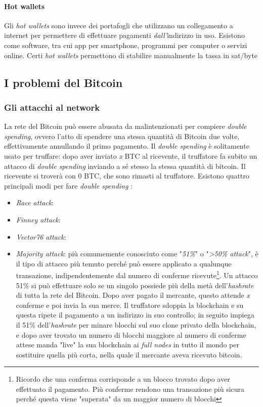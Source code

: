 \documentclass {article}
\begin{document}
\paragraph {Hot wallets}

Gli \textit{hot wallets} sono invece dei portafogli che utilizzano un collegamento a internet per permettere di effettuare pagamenti \emph{dall'}indirizzo in uso.
Esistono come software, tra cui app per smartphone, programmi per computer o servizi online.
Certi \textit{hot wallets} permettono di stabilire manualmente la tassa in sat/byte


\subsection {I problemi del Bitcoin}


\subsubsection {Gli attacchi al network}


La rete del Bitcoin può essere abusata da malintenzionati per compiere \textit{double spending}, ovvero l'atto di spendere una stessa quantità di Bitcoin due volte, effettivamente annullando il primo pagamento.
Il \textit{double spending} è solitamente usato per truffare: dopo aver inviato \textit{x} BTC al ricevente, il truffatore fa subito un attacco di \textit{double spending} inviando a sé stesso la stessa quantità di bitcoin. Il ricevente si troverà con 0 BTC, che sono rimasti al truffatore.
Esistono quattro principali modi per fare \textit{double spending} \cite{attacks}:

\begin{itemize}
\item \textit{Race attack}:
\item \textit{Finney attack}:
\item \textit{Vector76 attack}:
\item \textit{Majority attack}: più comumemente conosciuto come "\textit{51\%}" o "\textit{>50\% attack}", è il tipo di attacco più temuto perché può essere applicato a qualunque transazione, indipendentemente dal numero di conferme ricevute\footnote{Ricordo che una conferma corrisponde a un blocco trovato dopo aver effettuato il pagamento. Più conferme rendono una transazione più sicura perché questa viene "superata" da un maggior numero di blocchi}.
Un attacco 51\% si può effettuare solo se un singolo possiede più della metà dell'\textit{hashrate} di tutta la rete del Bitcoin.
Dopo aver pagato il mercante, questo attende \textit{x} conferme e poi invia la sua merce.
Il truffatore sdoppia la blockchain e su questa ripete il pagamento a un indirizzo in suo controllo; in seguito impiega il 51\% dell'\textit{hashrate} per minare blocchi sul suo clone privato della blockchain, e dopo aver trovato un numero di blocchi maggiore al numero di conferme attese manda "live" la sua blockchain ai \textit{full nodes} in tutto il mondo per sostituire quella più corta, nella quale il mercante aveva ricevuto bitcoin.
\end{itemize}
\end{document}
